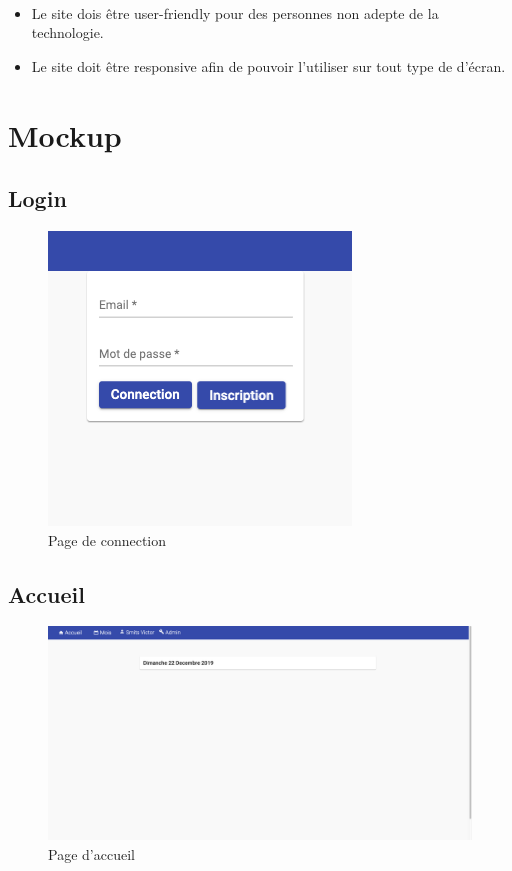 	\paragraph{}
		\begin{itemize}
			\item Le site dois être user-friendly pour des personnes non adepte de la technologie. 
			\item Le site doit être responsive afin de pouvoir l'utiliser sur tout type de d'écran. 
		\end{itemize}

\newpage
\section{Mockup}
	\subsection{Login}
		\begin{figure}[!htbp]
       	 	\includegraphics[width=0.5\linewidth, center]{Mockup/Login.png}
       	 	\caption{Page de connection}
       	\end{figure}
       	
    \vspace{\baselineskip}
	\subsection{Accueil}
		\begin{figure}[!htbp]
       	 	\includegraphics[width=0.8\linewidth, center]{Mockup/Accueil.png}
       	 	\caption{Page d'accueil}
       	\end{figure}
       	
